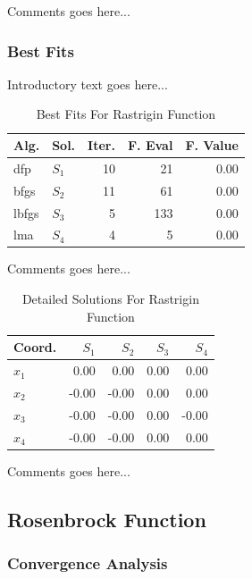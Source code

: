 \documentclass{ieeeaccess}
\begin{document}
Comments goes here...
\subsubsection{Best Fits}
\label{bestfitsrastrigin4d4D}


Introductory text goes here...
\begin{table}
\centering
\caption{Best Fits For Rastrigin Function}
\label{solutions:rastrigin4d}
\begin{tabular}{llrrr}
\toprule
 Alg. &    Sol. &  Iter. &  F. Eval &  F. Value \\
\midrule
  dfp & $S_{1}$ &     10 &       21 &      0.00 \\
 bfgs & $S_{2}$ &     11 &       61 &      0.00 \\
lbfgs & $S_{3}$ &      5 &      133 &      0.00 \\
  lma & $S_{4}$ &      4 &        5 &      0.00 \\
\bottomrule
\end{tabular}
\end{table}


Comments goes here...
\begin{table}
\centering
\caption{Detailed Solutions For Rastrigin Function}
\label{detailedsolutions:rastrigin4d}
\begin{tabular}{lrrrr}
\toprule
 Coord. &  $S_{1}$ &  $S_{2}$ &  $S_{3}$ &  $S_{4}$ \\
\midrule
$x_{1}$ &     0.00 &     0.00 &     0.00 &     0.00 \\
$x_{2}$ &    -0.00 &    -0.00 &     0.00 &     0.00 \\
$x_{3}$ &    -0.00 &    -0.00 &     0.00 &    -0.00 \\
$x_{4}$ &    -0.00 &    -0.00 &     0.00 &     0.00 \\
\bottomrule
\end{tabular}
\end{table}


Comments goes here...
\subsection{Rosenbrock Function}
\label{rosenbrock4d4D}

\subsubsection{Convergence Analysis}
\label{convergencerosenbrock4d4D}
\end{document}
